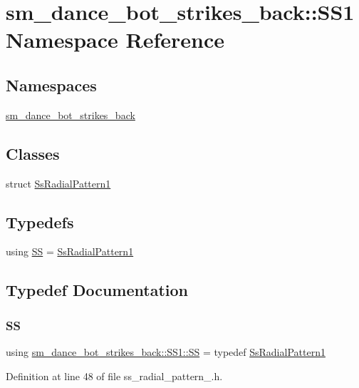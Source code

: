 \hypertarget{namespacesm__dance__bot__strikes__back_1_1SS1}{}\section{sm\+\_\+dance\+\_\+bot\+\_\+strikes\+\_\+back\+:\+:S\+S1 Namespace Reference}
\label{namespacesm__dance__bot__strikes__back_1_1SS1}
\subsection*{Namespaces}
\begin{DoxyCompactItemize}
\item 
 \hyperlink{namespacesm__dance__bot__strikes__back_1_1SS1_1_1sm__dance__bot__strikes__back}{sm\+\_\+dance\+\_\+bot\+\_\+strikes\+\_\+back}
\end{DoxyCompactItemize}
\subsection*{Classes}
\begin{DoxyCompactItemize}
\item 
struct \hyperlink{structsm__dance__bot__strikes__back_1_1SS1_1_1SsRadialPattern1}{Ss\+Radial\+Pattern1}
\end{DoxyCompactItemize}
\subsection*{Typedefs}
\begin{DoxyCompactItemize}
\item 
using \hyperlink{namespacesm__dance__bot__strikes__back_1_1SS1_ae3fc662548d76093fcfc00d91a5229d7}{SS} = \hyperlink{structsm__dance__bot__strikes__back_1_1SS1_1_1SsRadialPattern1}{Ss\+Radial\+Pattern1}
\end{DoxyCompactItemize}


\subsection{Typedef Documentation}
\mbox{\label{namespacesm__dance__bot__strikes__back_1_1SS1_ae3fc662548d76093fcfc00d91a5229d7}} 
\subsubsection{\texorpdfstring{SS}{SS}}
{\footnotesize\ttfamily using \hyperlink{namespacesm__dance__bot__strikes__back_1_1SS1_ae3fc662548d76093fcfc00d91a5229d7}{sm\+\_\+dance\+\_\+bot\+\_\+strikes\+\_\+back\+::\+S\+S1\+::\+SS} = typedef \hyperlink{structsm__dance__bot__strikes__back_1_1SS1_1_1SsRadialPattern1}{Ss\+Radial\+Pattern1}}



Definition at line 48 of file ss\+\_\+radial\+\_\+pattern\+\_.\+h.

